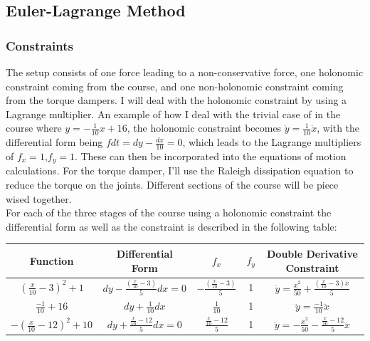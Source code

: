 \documentclass{article}
\begin{document}
\subsection{Euler-Lagrange Method}
\subsubsection{Constraints}
The setup consists of one force leading to a non-conservative force, one holonomic constraint coming from the course, and one non-holonomic constraint coming from the torque dampers. I will deal with the holonomic constraint by using a Lagrange multiplier.  An example of how I deal with the trivial case of in the course where $y=-\frac{1}{10}x+16$, the holonomic constraint becomes $\dot{y}=\frac{1}{10}\dot{x}$, with the differential form being $fdt=dy-\frac{dx}{10}=0$, which leads to the Lagrange multipliers of $f_x=1$,$f_y=1$. These can then be incorporated into the equations of motion calculations.  For the torque damper, I’ll use the Raleigh dissipation equation to reduce the torque on the joints. Different sections of the course will be piece wised together. \\
For each of the three stages of the course using a holonomic constraint the differential form as well as the constraint is described in the following table:
\begin{center}
\begin{tabular}{c|c|c|c|c}
	Function&Differential Form&$f_x$&$f_y$&Double Derivative Constraint\\
	\hline
	$(\frac{x}{10}-3)^2+1$&$dy-\frac{\left(\frac{x}{10} - 3\right)}{5} dx=0$&$-\frac{\left(\frac{x}{10} - 3\right)}{5}$&1&$\ddot{y}=\frac{\dot{x}^2}{50} + \frac{\left(\frac{x}{10} - 3\right) \ddot{x}}{5}$\\
	$\frac{-1}{10}+16$&$dy+\frac{1}{10}dx$&$\frac{1}{10}$&1&$\ddot{y}=\frac{-1}{10}\ddot{x}$\\
	$-(\frac{x}{10}-12)^2+10$&$dy+\frac{\frac{x}{10}-12}{5}dx=0$&$\frac{\frac{x}{10}-12}{5}$&1&$\ddot{y}=-\frac{\dot{x}^2}{50}-\frac{\frac{x}{10}-12}{5}\ddot{x}$\\
\end{tabular}
\end{center}
\end{document}
